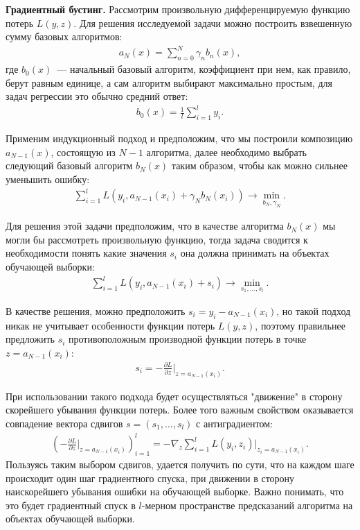 \documentclass[12pt,a4paper]{article} %
\begin{document}
\textbf{Градиентный бустинг.} Рассмотрим произвольную дифференцируемую функцию потерь $L(y,z)$. Для решения исследуемой задачи можно построить взвешенную сумму базовых алгоритмов:
\begin{gather}\label{gradbust1}
	a_N(x) = \sum\limits_{n=0}^{N}\gamma_nb_n(x), 
\end{gather}
где $b_0(x)$~--- начальный базовый алгоритм, коэффициент при нем, как правило, берут равным единице, а сам алгоритм выбирают максимально простым, для задач регрессии это обычно средний ответ:
\begin{gather}\label{gradbust2}
	b_0(x) =  \frac{1}{l}\sum\limits_{i=1}^{l}y_i.
\end{gather}

Применим индукционный подход и предположим, что мы построили композицию $a_{N-1}(x)$, состоящую из $N-1$ алгоритма, далее необходимо выбрать следующий базовый алгоритм $b_N(x)$ таким образом, чтобы как можно сильнее уменьшить ошибку:
\begin{gather}\label{gradbust3}
	\sum\limits_{i=1}^{l}L(y_i, a_{N-1}(x_i)+\gamma_Nb_N(x_i)) \rightarrow \min_{b_N, \gamma_N}.
\end{gather}

Для решения этой задачи предположим, что в качестве алгоритма $b_N(x)$ мы могли бы рассмотреть произвольную функцию, тогда задача сводится к необходимости понять какие значения $s_i$ она должна принимать на  объектах обучающей выборки:
\begin{gather}\label{gradbust4}
	\sum\limits_{i=1}^{l}L(y_i, a_{N-1}(x_i)+s_i) \rightarrow \min_{s_1, \dots, s_l}.
\end{gather}

В качестве решения, можно предположить $s_i = y_i-a_{N-1}(x_i)$, но такой подход никак не учитывает особенности функции потерь $L(y,z)$, поэтому правильнее предложить $s_i$ противоположным производной функции потерь в точке $z=a_{N-1}(x_i)$:
\begin{gather}\label{gradbust5}
	s_i = -\frac{\partial L}{\partial z}\bigg|_{z = a_{N-1}(x_i)}.
\end{gather}

При использовании такого подхода будет осуществляться "движение" в сторону скорейшего убывания функции потерь. Более того важным свойством оказывается совпадение вектора сдвигов $s = (s_1,\dots, s_l)$ с антиградиентом:
\begin{gather}\label{gradbust6}
	\left(-\frac{\partial L}{\partial z}\bigg|_{z = a_{N-1}(x_i)}\right)_{i=1}^{l} = -\nabla_z\sum\limits_{i=1}^{l}L(y_i, z_i)|_{z_i = a_{N-1}(x_i)}.
\end{gather}
Пользуясь таким выбором сдвигов, удается получить по сути, что на каждом шаге происходит один шаг градиентного спуска, при движении в сторону наискорейшего убывания ошибки на обучающей выборке. Важно понимать, что это будет градиентный спуск в $l$-мерном пространстве предсказаний алгоритма на объектах обучающей выборки. 
\end{document}
